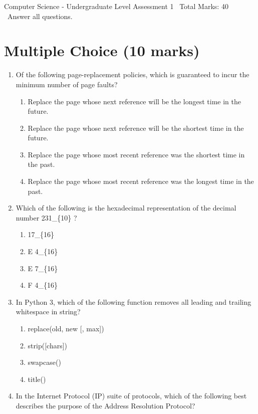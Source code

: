 \documentclass[12pt]{article}
\begin{document}
\begin{center}
Computer Science - Undergraduate Level Assessment 1 \
Total Marks: 40 \
Answer all questions.
\end{center}

\section*{Multiple Choice (10 marks)}
\begin{enumerate}[label=\arabic*.]
\item Of the following page-replacement policies, which is guaranteed to incur the minimum number of page faults?
\begin{enumerate}[label=(\alph*)]
    \item Replace the page whose next reference will be the longest time in the future.
    \item Replace the page whose next reference will be the shortest time in the future.
    \item Replace the page whose most recent reference was the shortest time in the past.
    \item Replace the page whose most recent reference was the longest time in the past.
\end{enumerate}
\item Which of the following is the hexadecimal representation of the decimal number 231\_\{10\} ?
\begin{enumerate}[label=(\alph*)]
    \item 17\_\{16\}
    \item E 4\_\{16\}
    \item E 7\_\{16\}
    \item F 4\_\{16\}
\end{enumerate}
\item In Python 3, which of the following function removes all leading and trailing whitespace in string?
\begin{enumerate}[label=(\alph*)]
    \item replace(old, new [, max])
    \item strip([chars])
    \item swapcase()
    \item title()
\end{enumerate}
\item In the Internet Protocol (IP) suite of protocols, which of the following best describes the purpose of the Address Resolution Protocol?
\begin{enumerate}[label=(\alph*)]

\end{enumerate}
\end{enumerate}
\end{document}
